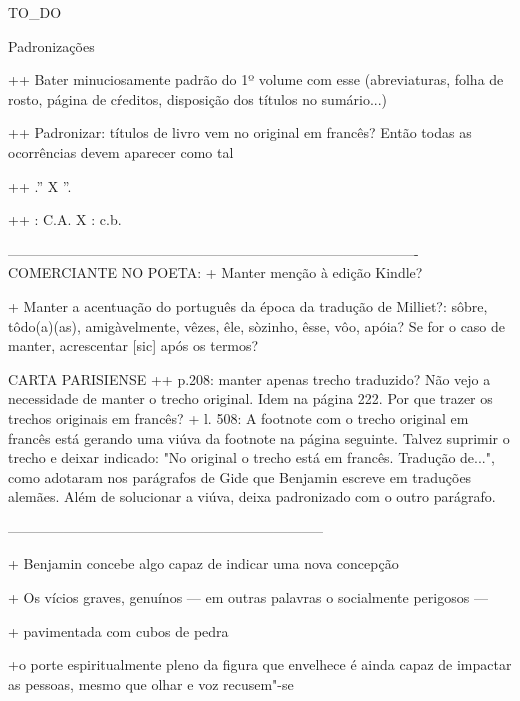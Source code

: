 TO_DO

Padronizações


++ Bater minuciosamente padrão do 1º volume com esse (abreviaturas, folha de rosto, página de cŕeditos, disposição dos títulos no sumário...)

++ Padronizar: títulos de livro vem no original em francês? Então todas as ocorrências devem aparecer como tal

++ .'' X ''.

++ : C.A. X : c.b.

----------------------------------------------------------------------------------------
COMERCIANTE NO POETA:
+ Manter menção à edição Kindle?


+ Manter a acentuação do português da época da tradução de Milliet?: sôbre, tôdo(a)(as), amigàvelmente, vêzes, êle, sòzinho, êsse, vôo, apóia? Se for o caso de manter, acrescentar [sic] após os termos?

CARTA PARISIENSE ++ p.208: manter apenas trecho traduzido? Não vejo a necessidade de manter o trecho original. Idem na página 222. Por que trazer os trechos originais em francês? + l. 508: A footnote com o trecho original em francês está gerando uma viúva da footnote na página seguinte. Talvez suprimir o trecho e deixar indicado: "No original o trecho está em francês. Tradução de...", como adotaram nos parágrafos de Gide que Benjamin escreve em traduções alemães. Além de solucionar a viúva, deixa padronizado com o outro parágrafo.


--------------------------------------------------------------------

+ Benjamin concebe algo capaz de indicar uma nova concepção


+ Os vícios graves, genuínos --- em outras palavras o
socialmente perigosos ---

+ pavimentada com cubos de pedra

+o porte espiritualmente pleno da figura que envelhece é ainda capaz de
impactar as pessoas, mesmo que olhar e voz recusem"-se